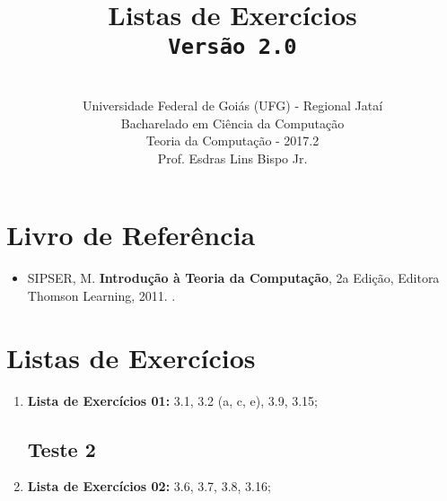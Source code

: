 \documentclass[12pt,a4paper,oneside]{article}
\author{\\Universidade Federal de Goiás (UFG) - Regional Jataí\\Bacharelado em Ciência da Computação \\Teoria da Computação - 2017.2 \\Prof. Esdras Lins Bispo Jr.}
\date{}
\title{
	\sc \huge Listas de Exercícios
	\\{\tt Versão 2.0}
}
\begin{document}
\maketitle

\section{Livro de Referência}
	\begin{itemize}
		\item SIPSER, M. {\bf Introdução à Teoria da Computação}, 2a Edição, Editora Thomson Learning, 2011. \color{blue}{\bf Código Bib.: [004 SIP/int]}.
	\end{itemize}
	
\section{Listas de Exercícios}

\begin{enumerate}

	\subsection{Teste 1}
	\item[] {\bf Lista de Exercícios 01:} 3.1, 3.2 (a, c, e), 3.9, 3.15;
	
	\subsection{Teste 2}
	
	\item[] {\bf Lista de Exercícios 02:} 3.6, 3.7, 3.8, 3.16;
%	
%		
%	
%	
	
\end{enumerate}
\end{document}
